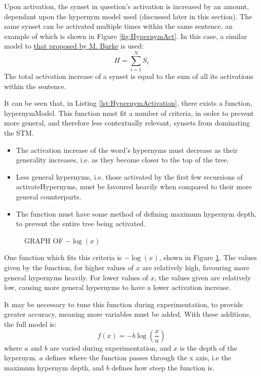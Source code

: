 \documentclass[]{article}
\begin{document}
Upon activation, the synset in question's activation is increased by an amount, dependant upon the hypernym model used (discussed later in this section). The same synset can be activated multiple times within the same sentence, an example of which is shown in Figure \ref{fig:HypernymAct}. In this case, a similar model to \hyperref[sec:MattBurke]{that proposed by M. Burke} \cite{MattBurkePrevious} is used: 
\[H = \sum\limits_{i=1}^N S_i\] 
The total activation increase of a synset is equal to the sum of all its activations within the sentence. 

It can be seen that, in Listing \ref{lst:HypernymActivation},  there exists a function, hypernymModel. This function must fit a number of criteria, in order to prevent more general, and therefore less contextually relevant, synsets from dominating the STM.

\begin{itemize}
	\item The activation increase of the word's hypernyms must decrease as their generality increases, i.e.  as they become closer to the top of the tree.
	
	\item Less general hypernyms, i.e. those activated by the first few recursions of activateHypernyms, must be favoured heavily when compared to their more general counterparts.
	
	\item The function must have some method of defining maximum hypernym depth, to prevent the entire tree being activated.
\end{itemize} 

\begin{figure}[h]
\caption{GRAPH OF $-\log(x)$}
\label{fig:logGraph}
\end{figure}

One function which fits this criteria is $-\log(x)$, shown in Figure \ref{fig:logGraph}. The values given by the function, for higher values of $x$ are relatively high, favouring more general hypernyms heavily. For lower values of $x$, the values given are relatively low, causing more general hypernyms to have a lower activation increase.

It may be necessary to tune this function during experimentation, to provide greater accuracy, meaning more variables must be added. With these additions, the full model is:
\[f(x) = -b\log(\frac{x}{a})\]
where $a$ and $b$ are varied during experimentation, and $x$ is the depth of the hypernym. $a$ defines where the function passes through the x axis, i.e the maximum hypernym depth, and $b$ defines how steep the function is.
\end{document}
